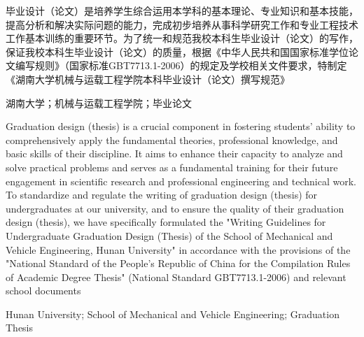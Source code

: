 \begin{abstractCN}
毕业设计（论文）是培养学生综合运用本学科的基本理论、专业知识和基本技能，提高分析和解决实际问题的能力，完成初步培养从事科学研究工作和专业工程技术工作基本训练的重要环节。为了统一和规范我校本科生毕业设计（论文）的写作，保证我校本科生毕业设计（论文）的质量，根据《中华人民共和国国家标准学位论文编写规则》（国家标准GBT7713.1-2006）的规定及学校相关文件要求，特制定《湖南大学机械与运载工程学院本科毕业设计（论文）撰写规范》

    \keywordsCN 湖南大学；机械与运载工程学院；毕业论文
\end{abstractCN}

\begin{abstractENG}
Graduation design (thesis) is a crucial component in fostering students' ability to comprehensively apply the fundamental theories, professional knowledge, and basic skills of their discipline. It aims to enhance their capacity to analyze and solve practical problems and serves as a fundamental training for their future engagement in scientific research and professional engineering and technical work. To standardize and regulate the writing of graduation design (thesis) for undergraduates at our university, and to ensure the quality of their graduation design (thesis), we have specifically formulated the "Writing Guidelines for Undergraduate Graduation Design (Thesis) of the School of Mechanical and Vehicle Engineering, Hunan University" in accordance with the provisions of the "National Standard of the People's Republic of China for the Compilation Rules of Academic Degree Thesis" (National Standard GBT7713.1-2006) and relevant school documents



    \keywordsENG Hunan University; School of Mechanical and Vehicle Engineering; Graduation Thesis
\end{abstractENG}